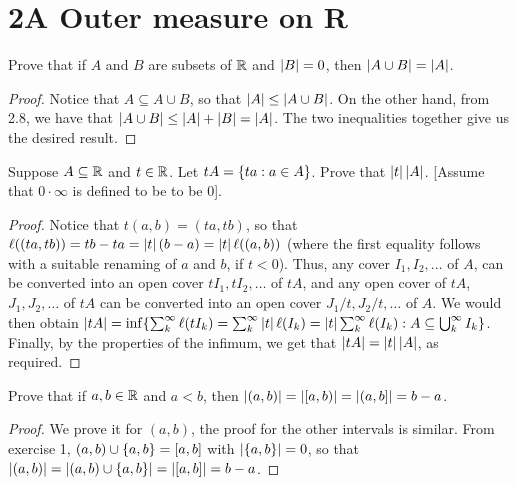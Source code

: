 \section{2A Outer measure on R}


\begin{exercise}{1}
Prove that if $A$ and $B$ are subsets of $\mathbb{R}$ and $\left\lvert B\right\rvert=0$, then $\left\lvert A\cup B\right\rvert = \left\lvert A\right\rvert$.
\end{exercise}
\begin{proof}
Notice that $A\subseteq A\cup B$, so that $\left\lvert A\right\rvert\leq \left\lvert A\cup B\right\rvert$. 
On the other hand, from 2.8, we have that $\left\lvert A\cup B\right\rvert\leq \left\lvert A\right\rvert + \left\lvert B\right\rvert = \left\lvert A\right\rvert$.
The two inequalities together give us the desired result.
\end{proof} 

\begin{exercise}{2}
Suppose $A\subseteq\mathbb{R}$ and $t\in\mathbb{R}$.
Let $tA=\{ta:a\in A\}$.
Prove that $\left\lvert t\right\rvert\left\lvert A\right\rvert$.
[Assume that $0\cdot\infty$ is defined to be to be 0].
\end{exercise}
\begin{proof}
Notice that $t(a,b) = (ta,tb)$, so that $\ell((ta,tb))= tb-ta = \left\lvert t\right\rvert(b-a) = \left\lvert t\right\rvert\ell((a,b))$ (where the first equality follows with a suitable renaming of $a$ and $b$, if $t<0$).
Thus, any cover $I_1,I_2,\dots$ of $A$, can be converted into an open cover $tI_1,tI_2,\dots$ of $tA$, and any open cover of $tA$, $J_1,J_2,\dots$ of $tA$ can be converted into an open cover $J_1/t, J_2/t,\dots$ of $A$.
We would then obtain $\left\lvert tA\right\rvert = \inf\{\sum_k^\infty \ell(tI_k) = \sum_k^\infty \left\lvert t\right\rvert\ell(I_k) = \left\lvert t\right\rvert\sum_k^\infty \ell(I_k): A\subseteq \bigcup_k^\infty I_k\}$.
Finally, by the properties of the infimum, we get that $\left\lvert tA\right\rvert = \left\lvert t\right\rvert\left\lvert A\right\rvert$, as required.
\end{proof} 

\begin{exercise}{6}
Prove that if $a,b\in\mathbb{R}$ and $a<b$, then $\left\lvert (a,b)\right\rvert = \left\lvert [a,b)\right\rvert = \left\lvert (a,b]\right\rvert = b-a$.
\end{exercise}
\begin{proof}
We prove it for $(a,b)$, the proof for the other intervals is similar.
From exercise 1, $(a,b) \cup \{a,b\} = [a,b]$ with $\left\lvert \{a,b\}\right\rvert = 0$, so that $\left\lvert (a,b)\right\rvert = \left\lvert (a,b) \cup \{a,b\}\right\rvert = \left\lvert [a,b]\right\rvert = b-a$.
\end{proof} 

